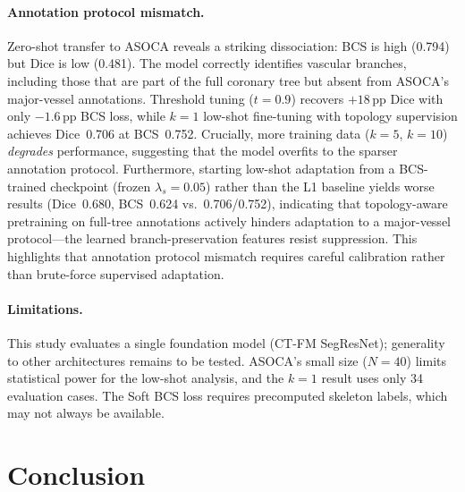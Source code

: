 \documentclass[runningheads]{llncs}
\begin{document}
\paragraph{Annotation protocol mismatch.}
Zero-shot transfer to ASOCA reveals a striking dissociation: BCS is high (0.794) but Dice is low (0.481).
The model correctly identifies vascular branches, including those that are part of the full coronary tree but absent from ASOCA's major-vessel annotations.
Threshold tuning ($t{=}0.9$) recovers $+18$\,pp Dice with only $-1.6$\,pp BCS loss, while $k{=}1$ low-shot fine-tuning with topology supervision achieves Dice~0.706 at BCS~0.752.
Crucially, more training data ($k{=}5$, $k{=}10$) \emph{degrades} performance, suggesting that the model overfits to the sparser annotation protocol.
Furthermore, starting low-shot adaptation from a BCS-trained checkpoint (frozen $\lambda_s{=}0.05$) rather than the L1 baseline yields worse results (Dice~0.680, BCS~0.624 vs.\ 0.706/0.752), indicating that topology-aware pretraining on full-tree annotations actively hinders adaptation to a major-vessel protocol---the learned branch-preservation features resist suppression.
This highlights that annotation protocol mismatch requires careful calibration rather than brute-force supervised adaptation.

\paragraph{Limitations.}
This study evaluates a single foundation model (CT-FM SegResNet); generality to other architectures remains to be tested.
ASOCA's small size ($N{=}40$) limits statistical power for the low-shot analysis, and the $k{=}1$ result uses only 34 evaluation cases.
The Soft BCS loss requires precomputed skeleton labels, which may not always be available.

\section{Conclusion}
\end{document}

